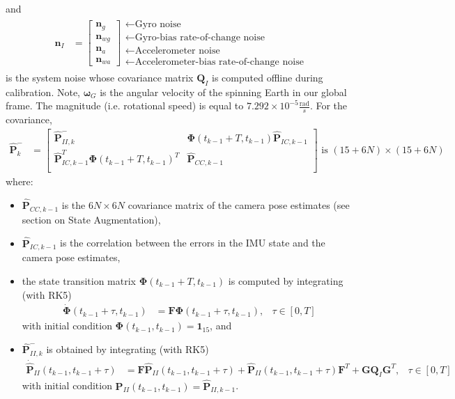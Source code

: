 \documentclass[10pt,letterpaper,fleqn,oneside]{article}
\newcommand{\nl}{\\[0.5em]}
\def\Vec#1{\mathbf{#1}} %
\newcommand{\bbm}{\begin{bmatrix}}
\newcommand{\ebm}{\end{bmatrix}}
\begin{document}
and
\begin{align}
\Vec{n}_I &= \bbm \Vec{n}_g \nl \Vec{n}_{wg} \nl \Vec{n}_a \nl \Vec{n}_{wa} \ebm
					\begin{array}{l}
					\leftarrow \text{Gyro noise} \nl
					\leftarrow \text{Gyro-bias rate-of-change noise} \nl
					\leftarrow \text{Accelerometer noise} \nl
					\leftarrow \text{Accelerometer-bias rate-of-change noise}
					\end{array}		
\end{align}
is the system noise whose covariance matrix $\Vec{Q}_I$ is computed offline during calibration. Note, $\pmb{\omega}_G$ is the angular velocity of the spinning Earth in our global frame. The magnitude (i.e. rotational speed) is equal to $7.292 \times 10^{−5} \frac{\text{rad}}{s}$. 
\newpage\noindent
For the covariance,
\begin{align}
\hat{\Vec{P}}^-_k &= \bbm	\hat{\Vec{P}}^-_{II, k} & \boldsymbol{\Phi}\left(t_{k-1} + T, t_{k-1}\right)\hat{\Vec{P}}_{IC, k-1}\nl
											\hat{\Vec{P}}_{IC, k-1}^T \boldsymbol{\Phi}\left(t_{k-1} + T, t_{k-1}\right)^T & \hat{\Vec{P}}_{CC, k-1}\nl
								\ebm \text{ is }\left(15 + 6N\right)\times\left(15 + 6N\right)
\end{align}
where:
\begin{itemize}
\item $\hat{\Vec{P}}_{CC, k-1}$ is the $6N\times6N$ covariance matrix of the camera pose estimates (see section on State Augmentation), 
\item $\hat{\Vec{P}}_{IC, k-1}$ is the correlation between the errors in the IMU state and the camera pose estimates,
\item the state transition matrix $\boldsymbol{\Phi}\left(t_{k-1} + T, t_{k-1}\right)$ is computed by integrating (with RK5)
\begin{align}
\dot{\boldsymbol{\Phi}}\left(t_{k-1} + \tau, t_{k-1}\right) &= \Vec{F}\boldsymbol{\Phi}\left(t_{k-1} + \tau, t_{k-1}\right), &\tau\in\left[0,T\right]
\end{align}
with initial condition $\boldsymbol{\Phi}\left(t_{k-1}, t_{k-1}\right) = \Vec{1}_{15}$, and
\item $\hat{\Vec{P}}^-_{II, k}$ is obtained by integrating (with RK5)
\begin{align}
\dot{\hat{\Vec{P}}}_{II}\left(t_{k-1}, t_{k-1}+\tau\right) &= \Vec{F}\hat{\Vec{P}}_{II}\left(t_{k-1}, t_{k-1}+\tau\right) + \hat{\Vec{P}}_{II}\left(t_{k-1}, t_{k-1}+\tau\right)\Vec{F}^T + \Vec{G}\Vec{Q}_I\Vec{G}^T, &\tau\in\left[0,T\right]
\end{align}
with initial condition $\Vec{P}_{II}\left(t_{k-1}, t_{k-1}\right) = \hat{\Vec{P}}_{II, k-1}$.
\end{itemize}
\end{document}
